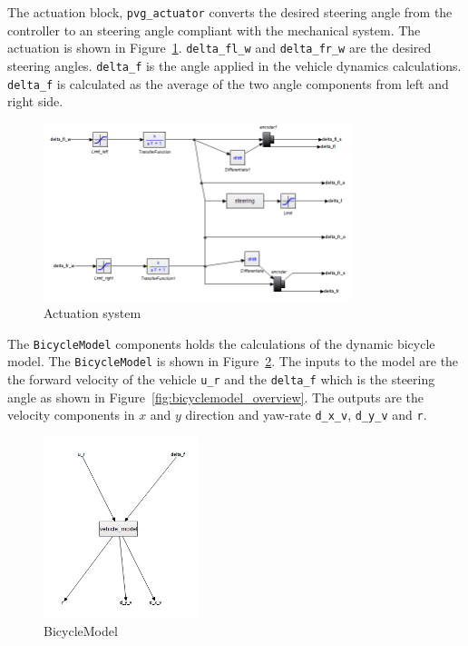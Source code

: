 \begin{description}
The actuation block, \texttt{pvg\_actuator} converts the desired steering angle from the controller to an steering angle compliant with the mechanical system. The actuation is shown in Figure~\ref{fig:pvg_actuation_20sim}. \texttt{delta\_fl\_w} and \texttt{delta\_fr\_w} are the desired steering angles. \texttt{delta\_f} is the angle applied in the vehicle dynamics calculations. \texttt{delta\_f} is calculated as the average of the two angle components from left and right side.   
	\begin{figure}[htbp]
		\begin{center}
			\includegraphics[width=0.8\textwidth]{vehicle/Steering_actuator.png}
			\caption{Actuation system}
			\label{fig:pvg_actuation_20sim}
		\end{center}
	\end{figure}
	
	The \texttt{BicycleModel} components holds the calculations of the dynamic bicycle model. The \texttt{BicycleModel} is shown in Figure~\ref{fig:bicyclemodel_20sim}. The inputs to the model are the the forward velocity of the vehicle \texttt{u\_r} and the \texttt{delta\_f} which is the steering angle as shown in Figure~\ref{fig:bicyclemodel_overview}. The outputs are the velocity components in $x$ and $y$ direction and yaw-rate \texttt{d\_x\_v}, \texttt{d\_y\_v} and \texttt{r}.  
	\begin{figure}[htbp]
	\begin{center}
		\includegraphics[width=0.4\textwidth]{vehicle/Bycycle_model.png}
		\caption{BicycleModel}
		\label{fig:bicyclemodel_20sim}
	\end{center}
	\end{figure}
	

\end{description}

